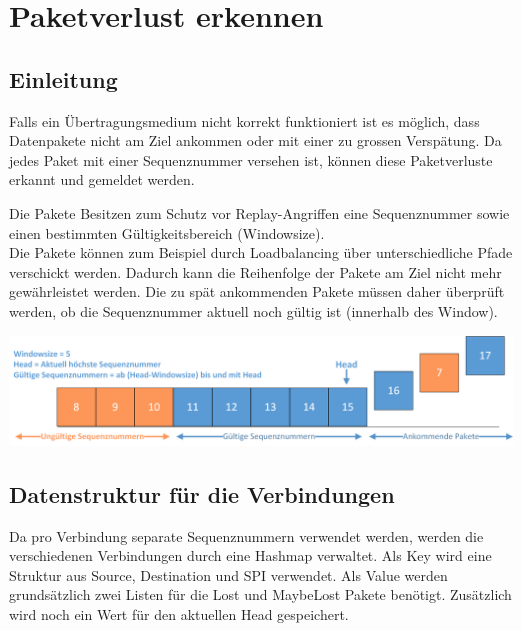 \section{Paketverlust erkennen}
\label{sec:Paketverlust erkennen}

\subsection{Einleitung}

{\raggedright
Falls ein \"{U}bertragungsmedium nicht korrekt funktioniert ist es m\"{o}glich,
dass Datenpakete nicht am Ziel ankommen oder mit einer zu grossen Versp\"{a}tung.
Da jedes \esp Paket mit einer Sequenznummer versehen ist, k\"{o}nnen diese
Paketverluste erkannt und gemeldet werden.
}

{\raggedright
Die \esp Pakete Besitzen zum Schutz vor Replay-Angriffen eine Sequenznummer sowie
einen bestimmten G\"{u}ltigkeitsbereich (Windowsize).
\\
Die Pakete k\"{o}nnen zum Beispiel durch Loadbalancing \"{u}ber unterschiedliche
Pfade verschickt werden. Dadurch kann die Reihenfolge der Pakete am Ziel nicht
mehr gew\"{a}hrleistet werden. Die zu sp\"{a}t ankommenden Pakete m\"{u}ssen
daher \"{u}berpr\"{u}ft werden, ob die Sequenznummer aktuell noch g\"{u}ltig ist
(innerhalb des Window).
}

\includegraphics[width=1\textwidth]{start/img/Sequenznummern.png}

\subsection{Datenstruktur für die \esp Verbindungen}
Da pro Verbindung separate Sequenznummern verwendet werden, werden die verschiedenen Verbindungen durch eine Hashmap verwaltet. Als Key wird eine Struktur aus Source, Destination und \acs{SPI} verwendet. Als Value werden grundsätzlich zwei Listen für die Lost und MaybeLost Pakete benötigt. Zusätzlich wird noch ein Wert für den aktuellen Head gespeichert.

